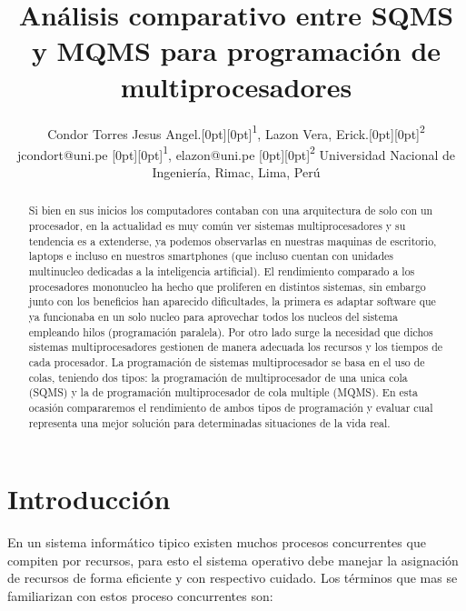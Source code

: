 \documentclass[conference,letterpaper]{IEEEtran}
\DeclareRobustCommand*{\IEEEauthorrefmark}[1]{\raisebox{0pt}[0pt][0pt]{\textsuperscript{\footnotesize #1}}}
\begin{document}
\title
{
Análisis comparativo entre SQMS y MQMS para programación de multiprocesadores
}

\author
{
\IEEEauthorblockN
{
Condor Torres Jesus Angel.\IEEEauthorrefmark{1},
Lazon Vera, Erick.\IEEEauthorrefmark{2} 
}                                     
\IEEEauthorblockA
{
jcondort@uni.pe \IEEEauthorrefmark{1},
elazon@uni.pe \IEEEauthorrefmark{2}
}
\IEEEauthorblockA
{
Universidad Nacional de Ingeniería, Rimac, Lima, Perú}
}

\maketitle

\begin{abstract}
Si bien en sus inicios los computadores contaban con una arquitectura de solo con un procesador, en la actualidad es muy común ver sistemas multiprocesadores y su tendencia es a extenderse, ya podemos observarlas en nuestras maquinas de escritorio, laptops e incluso en nuestros smartphones (que incluso cuentan con unidades multinucleo dedicadas a la inteligencia artificial). El rendimiento comparado a los procesadores mononucleo ha hecho que proliferen en distintos sistemas, sin embargo junto con los beneficios han aparecido dificultades, la primera es adaptar software que ya funcionaba en un solo nucleo para aprovechar todos los nucleos del sistema empleando hilos (programación paralela). Por otro lado surge la necesidad que dichos sistemas multiprocesadores gestionen de manera adecuada los recursos y los tiempos de cada procesador. La programación de sistemas multiprocesador se basa en el uso de colas, teniendo dos tipos: la programación de multiprocesador de una unica cola (SQMS) y la de programación multiprocesador de cola multiple (MQMS). En esta ocasión compararemos el rendimiento de ambos tipos de programación y evaluar cual representa una mejor solución para determinadas situaciones de la vida real.
\end{abstract}


\IEEEpeerreviewmaketitle

\vspace{7pt}
\section{Introducción}
En un sistema inform\'atico tipico existen muchos procesos concurrentes que compiten por recursos, para esto el sistema operativo debe manejar la asignación de recursos de forma eficiente y con respectivo cuidado. Los términos que mas se familiarizan con estos proceso concurrentes son:
\end{document}
